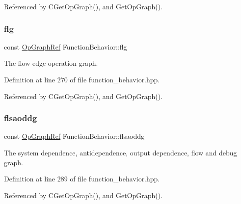 Referenced by C\+Get\+Op\+Graph(), and Get\+Op\+Graph().

\mbox{\label{classFunctionBehavior_a30c5330e2065aa9e873d256ed6189aaa}} 
\subsubsection{\texorpdfstring{flg}{flg}}
{\footnotesize\ttfamily const \hyperlink{op__graph_8hpp_aee97c95c40f791b60c451d9e29c72d39}{Op\+Graph\+Ref} Function\+Behavior\+::flg\hspace{0.3cm}{\ttfamily [private]}}



The flow edge operation graph. 



Definition at line 270 of file function\+\_\+behavior.\+hpp.



Referenced by C\+Get\+Op\+Graph(), and Get\+Op\+Graph().

\mbox{\label{classFunctionBehavior_a0d478c76139ce36a5bc221860dcc9280}} 
\subsubsection{\texorpdfstring{flsaoddg}{flsaoddg}}
{\footnotesize\ttfamily const \hyperlink{op__graph_8hpp_aee97c95c40f791b60c451d9e29c72d39}{Op\+Graph\+Ref} Function\+Behavior\+::flsaoddg\hspace{0.3cm}{\ttfamily [private]}}



The system dependence, antidependence, output dependence, flow and debug graph. 



Definition at line 289 of file function\+\_\+behavior.\+hpp.



Referenced by C\+Get\+Op\+Graph(), and Get\+Op\+Graph().

\mbox{\label{classFunctionBehavior_a8086f33f4edd8e2ec8081fb3cf043114}} 
